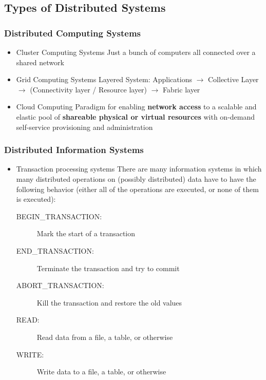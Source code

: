 \subsection{Types of Distributed Systems}
\subsubsection{Distributed Computing Systems}
\begin{itemize}
	\item Cluster Computing Systems
	\subitem Just a bunch of computers all connected over a shared network
	\item Grid Computing Systems
	\subitem Layered System: Applications $\rightarrow$ Collective Layer $\rightarrow$ (Connectivity layer / Resource layer) $\rightarrow$ Fabric layer
	\item Cloud Computing
	\subitem Paradigm for enabling \textbf{network access} to a scalable and elastic pool of \textbf{shareable physical or virtual resources} with on-demand self-service provisioning and administration
\end{itemize}
\subsubsection{Distributed Information Systems}
\begin{itemize}
	\item Transaction processing systems
	\subitem There are many information systems in which many distributed operations on (possibly distributed) data have to have the following behavior (either all of the operations are executed, or none of them is executed):
	\begin{description}
		\item[BEGIN\_TRANSACTION:] Mark the start of a transaction
		\item[END\_TRANSACTION:] Terminate the transaction and try to commit
		\item[ABORT\_TRANSACTION:] Kill the transaction and restore the old values
		\item[READ:] Read data from a file, a table, or otherwise
		\item[WRITE:] Write data to a file, a table, or otherwise
	\end{description}
\end{itemize}

